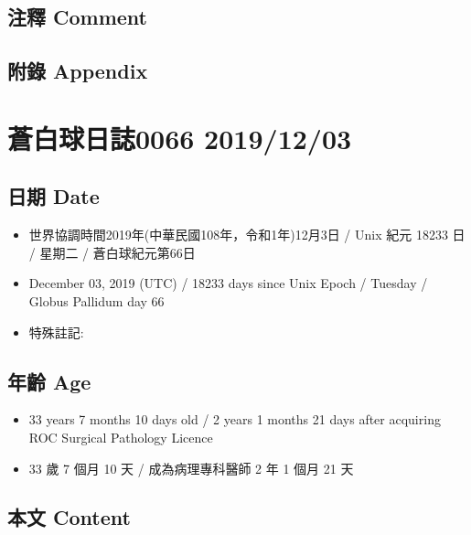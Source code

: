 \documentclass[
]{article}
\providecommand{\tightlist}{%
  \setlength{\itemsep}{0pt}\setlength{\parskip}{0pt}}
\begin{document}
\hypertarget{ux6ce8ux91cb-comment-1}{%
\subsection{注釋 Comment}\label{ux6ce8ux91cb-comment-1}}

\hypertarget{ux9644ux9304-appendix-1}{%
\subsection{附錄 Appendix}\label{ux9644ux9304-appendix-1}}

\hypertarget{ux84bcux767dux7403ux65e5ux8a8c0066-20191203}{%
\section{蒼白球日誌0066
2019/12/03}\label{ux84bcux767dux7403ux65e5ux8a8c0066-20191203}}

\hypertarget{ux65e5ux671f-date-2}{%
\subsection{日期 Date}\label{ux65e5ux671f-date-2}}

\begin{itemize}
\tightlist
\item
  世界協調時間2019年(中華民國108年，令和1年)12月3日 / Unix 紀元 18233 日
  / 星期二 / 蒼白球紀元第66日
\item
  December 03, 2019 (UTC) / 18233 days since Unix Epoch / Tuesday /
  Globus Pallidum day 66
\item
  特殊註記:
\end{itemize}

\hypertarget{ux5e74ux9f61-age-2}{%
\subsection{年齡 Age}\label{ux5e74ux9f61-age-2}}

\begin{itemize}
\tightlist
\item
  33 years 7 months 10 days old / 2 years 1 months 21 days after
  acquiring ROC Surgical Pathology Licence
\item
  33 歲 7 個月 10 天 / 成為病理專科醫師 2 年 1 個月 21 天
\end{itemize}

\hypertarget{ux672cux6587-content-2}{%
\subsection{本文 Content}\label{ux672cux6587-content-2}}
\end{document}
